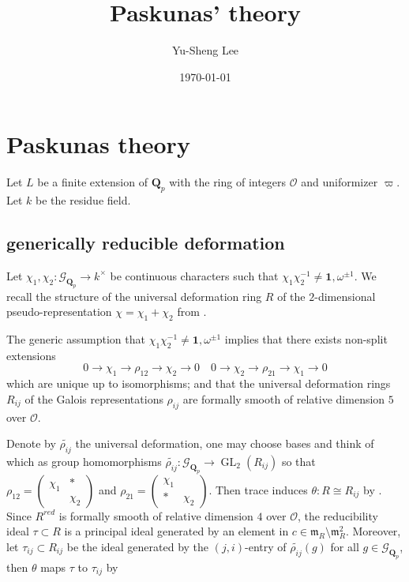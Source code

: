 \documentclass[leqno]{amsart}
\newcommand{\smat}[1]{\left( \begin{smallmatrix} #1 \end{smallmatrix} \right)}
\newcommand{\Gp}{\mathcal{G}_{\Qp}} %
\DeclareMathOperator{\GL}{GL}
\newcommand{\Qp}{\mathbf{Q}_p}
\newcommand{\oo}{\mathcal O}
\newcommand{\id}{\mathbf{1}}
\newcommand{\1}{\mathbf{1}}
\newcommand{\fm}{\mathfrak m}
\theoremstyle{definition}
\theoremstyle{remark}
\begin{document}
\title{Paskunas' theory}
\author[Y-S.~Lee]{Yu-Sheng Lee}
\address{Department of Mathematics, University  of Michigan, Ann Arbor, MI 48109, USA}
\date{\today}

\maketitle
\setcounter{tocdepth}{1}
\tableofcontents





\section{Paskunas theory}

Let $L$ be a finite extension of  $\Qp$
with the ring of integers  $\oo$
and uniformizer  $\varpi$.
Let  $k$ be the residue field.

\subsection{generically reducible deformation}

Let $\chi_1,\chi_2\colon \Gp\to k^\times$ be continuous characters
such that $\chi_1\chi_2^{-1}\neq \id,\omega^{\pm1}$.
We recall 
the structure of the universal deformation ring $R$
of the $2$-dimensional pseudo-representation $\chi=\chi_1+\chi_2$ from \cite[\S B.1]{pask}.

The generic assumption that $\chi_1\chi_2^{-1}\neq \id,\omega^{\pm1}$
implies that there exists non-split extensions
\[
    0\to \chi_1\to \rho_{12}\to \chi_2\to 0\quad
    0\to \chi_2\to \rho_{21}\to \chi_1\to 0
\]
which are unique up to isomorphisms;
and that the universal deformation rings
$R_{ij}$ of the Galois representations $\rho_{ij}$
are formally smooth of relative dimension $5$ over $\oo$.

Denote by $\tilde{\rho_{ij}}$ the universal deformation,
one may choose bases and think of which as group homomorphisms
$\tilde{\rho_{ij}}\colon \Gp\to \GL_2(R_{ij})$
so that 
$\rho_{12}=\smat{\chi_1&*\\&\chi_2}$ and
$\rho_{21}=\smat{\chi_1&\\*&\chi_2}$.
Then trace induces $\theta\colon R\cong R_{ij}$ by \cite[Prop B.17]{pask}.
Since $R^{red}$ is formally smooth of relative dimension $4$ over  $\oo$,
the reducibility ideal  $\tau\subset R$ is a principal ideal generated by 
an element in $c\in\fm_R\setminus \fm_R^2$. 
Moreover, let $\tau_{ij}\subset R_{ij} $ be the ideal 
generated by the $(j,i)$-entry of  $ \tilde{\rho_{ij}}(g)$
for all $g\in \Gp$,
then  $\theta$ maps  $\tau$ to  $\tau_{ij}$ by \cite[Prop B.23]{pask}
\end{document}
